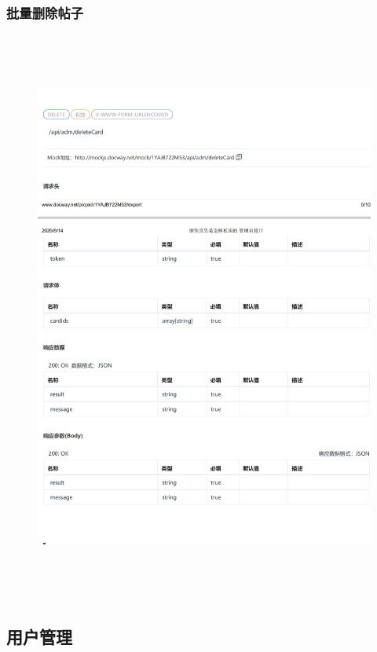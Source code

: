 \subsubsection{批量删除帖子}
\begin{figure}[h]
    \centering
    \includegraphics[height=19.0cm,width=14.0cm]{design/image/api38.png} 
    \end{figure}  
    \newpage

\subsection{用户管理}

